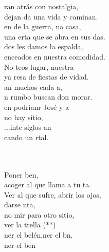\documentclass[12pt]{article}
\begin{document}
\begin{multicols*}{2}
\begin{cancion}%
	ran atrás con nostalgia,\\
	dejan da una vida y caminan.\\
	en de la guerra, na casa,\\
	una erta que se abra en sus das.\\
\jump
	dos les damos la espalda,\\
	enceados en nuestra comodidad.\\
	No teos lugar, nuestra \\
	ya resa de fiestas de vidad.\\
\jump
	an muchos cada a, \\
	n rumbo buscan don morar.\\
	en podríanr José y a\\
	no hay sitio,\\
	...inte siglos an\\
	cando un rtal.\\\jump\\
	\begin{chorus}%
	     \\
	Poner ben, \\
	acoger al que llama a tu ta.\\
Ver al que sufre, abrir los ojos,\\
	darse nta,\\
	no mir para otro sitio, \\
	ver la trella (**)\\
	ner el belén,ner el bn,\\
	ner el ben   \\
	\end{chorus}%
	\jump\\

\end{cancion}
\end{multicols*}
\end{document}
